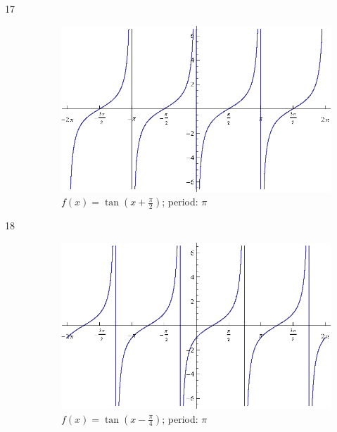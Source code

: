 \documentclass{exam}
\begin{document}
\begin{description}
      \item[17]
        \begin{figure}[H]
          \centering
          \includegraphics[scale=0.9]{exercise17.eps}
          \caption{$f(x) = \tan \left( x + \frac{\pi}{2} \right)$; period: $\pi$}
        \end{figure}

      \item[18]
        \begin{figure}[H]
          \centering
          \includegraphics[scale=0.9]{exercise18.eps}
          \caption{$f(x) = \tan \left( x - \frac{\pi}{4} \right)$; period: $\pi$}
        \end{figure}


\end{description}
\end{document}

